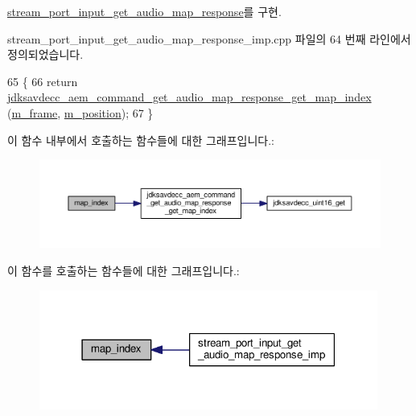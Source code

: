 \hyperlink{classavdecc__lib_1_1stream__port__input__get__audio__map__response_a95b259013c01868261bbe7e7d5768b59}{stream\+\_\+port\+\_\+input\+\_\+get\+\_\+audio\+\_\+map\+\_\+response}를 구현.



stream\+\_\+port\+\_\+input\+\_\+get\+\_\+audio\+\_\+map\+\_\+response\+\_\+imp.\+cpp 파일의 64 번째 라인에서 정의되었습니다.


\begin{DoxyCode}
65 \{
66     \textcolor{keywordflow}{return} \hyperlink{group__command__get__audio__map__response_ga64da102f201b88cea6fea5c801a1d8e5}{jdksavdecc\_aem\_command\_get\_audio\_map\_response\_get\_map\_index}
      (\hyperlink{classavdecc__lib_1_1stream__port__input__get__audio__map__response__imp_a50417969cf438e7c8d698726bbbe2ff9}{m\_frame}, \hyperlink{classavdecc__lib_1_1stream__port__input__get__audio__map__response__imp_af5e691c4a8a0feb07f48440b321206cd}{m\_position});
67 \}
\end{DoxyCode}


이 함수 내부에서 호출하는 함수들에 대한 그래프입니다.\+:
\nopagebreak
\begin{figure}[H]
\begin{center}
\leavevmode
\includegraphics[width=350pt]{classavdecc__lib_1_1stream__port__input__get__audio__map__response__imp_a2fdcf4d2f53407b6a6b165ec04b38b25_cgraph}
\end{center}
\end{figure}




이 함수를 호출하는 함수들에 대한 그래프입니다.\+:
\nopagebreak
\begin{figure}[H]
\begin{center}
\leavevmode
\includegraphics[width=315pt]{classavdecc__lib_1_1stream__port__input__get__audio__map__response__imp_a2fdcf4d2f53407b6a6b165ec04b38b25_icgraph}
\end{center}
\end{figure}


